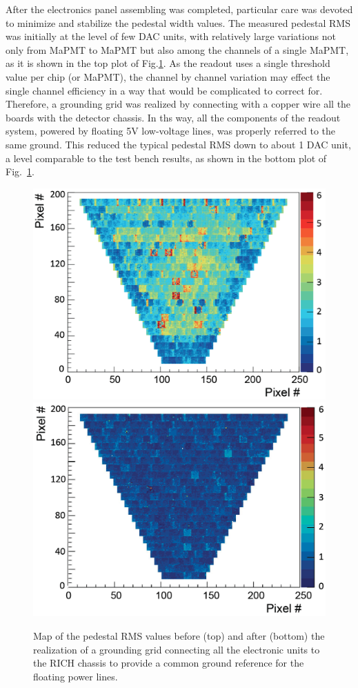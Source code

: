 \documentclass[5p,times,twocolumn]{elsarticle}
\begin{document}
After the electronics panel assembling was completed, particular care was devoted to minimize and stabilize the pedestal width values.
The measured pedestal RMS was initially at the level of few DAC units, with relatively large variations not only from MaPMT to MaPMT but also among the channels of a single MaPMT, as it is shown in the top plot of Fig.\ref{fig:GroundG}. As the readout uses a single threshold value per chip (or MaPMT), the channel by channel variation may effect the single channel efficiency in a way that  would be complicated to correct for. Therefore, a grounding grid was realized by connecting with a copper wire all the boards with the detector chassis. In ths way, all the components of the readout system, powered by floating 5V low-voltage lines, was properly referred to the same ground. This reduced the typical pedestal RMS down to about 1 DAC unit, a level comparable to the test bench results, as shown in the bottom plot of Fig.~\ref{fig:GroundG}.


\begin{figure}[t]
\begin{center}
\includegraphics[width=0.9\columnwidth]{pedestal_rms_before.png}
\includegraphics[width=0.9\columnwidth]{pedestal_rms_after.png}
\end{center}
\caption{Map of the pedestal RMS values before (top) and after (bottom) the realization of a grounding grid connecting all the electronic units to the RICH chassis to provide a common ground reference for the floating power lines.}
\label{fig:GroundG}
\end{figure}
\end{document}
